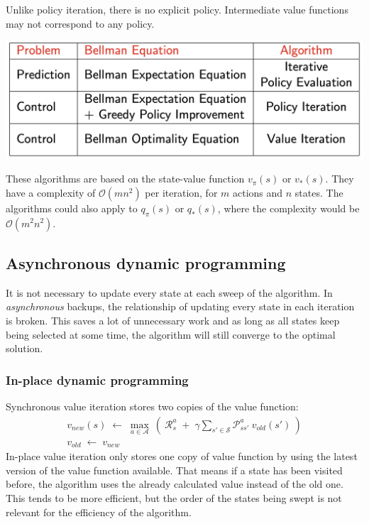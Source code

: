\documentclass[10pt]{article}
\begin{document}
Unlike policy iteration, there is no explicit policy. Intermediate value functions may not correspond to any policy.

\includegraphics[scale=0.2]{pictures/synchronous_algorithms.jpg}

These algorithms are based on the state-value function $v_{\pi}(s)$ or $v_{*}(s)$. They have a complexity of $\mathcal{O}(mn^2)$ per iteration, for $m$ actions and $n$ states. The algorithms could also apply to $q_{\pi}(s)$ or $q_{*}(s)$, where the complexity would be $\mathcal{O}(m^{2}n^{2})$.

\subsection{Asynchronous dynamic programming}
It is not necessary to update every state at each sweep of the algorithm. In \textit{asynchronous} backups, the relationship of updating every state in each iteration is broken. This saves a lot of unnecessary work and as long as all states keep being selected at some time, the algorithm will still converge to the optimal solution.

\subsubsection*{In-place dynamic programming}
Synchronous value iteration stores two copies of the value function:
\begin{align}
v_{new}(s)\; \leftarrow \; \mathop{max}_{a \in \mathcal{A}}\: \left( \: \mathcal{R}_{s}^{a}\;+\;\gamma \sum_{s' \in \mathcal{S}} \mathcal{P}_{ss'}^{a}\:v_{old}(s') \: \right) \\ 
v_{old} \; \leftarrow \; v_{new}
\end{align}
In-place value iteration only stores one copy of value function by using the latest version of the value function available. That means if a state has been visited before, the algorithm uses the already calculated value instead of the old one. This tends to be more efficient, but the order of the states being swept is not relevant for the efficiency of the algorithm.
\end{document}
